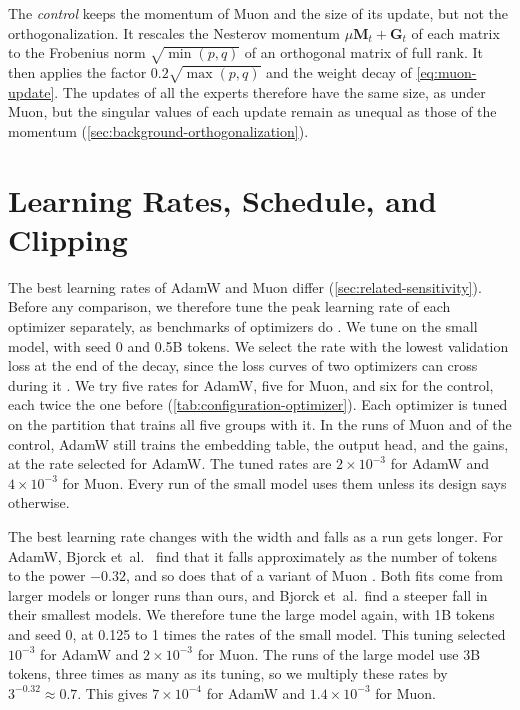 The \emph{control} keeps the momentum of Muon and the size of its update, but not the orthogonalization. It rescales the Nesterov momentum $\mu \mathbf{M}_t + \mathbf{G}_t$ of each matrix to the Frobenius norm $\sqrt{\min(p, q)}$ of an orthogonal matrix of full rank. It then applies the factor $0.2 \sqrt{\max(p, q)}$ and the weight decay of \cref{eq:muon-update}. The updates of all the experts therefore have the same size, as under Muon, but the singular values of each update remain as unequal as those of the momentum (\cref{sec:background-orthogonalization}).

\section{Learning Rates, Schedule, and Clipping}
\label{sec:method-tuning}
The best learning rates of AdamW and Muon differ (\cref{sec:related-sensitivity}). Before any comparison, we therefore tune the peak learning rate of each optimizer separately, as benchmarks of optimizers do \cite{wen2025fantastic, semenov2025benchmarking}. We tune on the small model, with seed 0 and 0.5B tokens. We select the rate with the lowest validation loss at the end of the decay, since the loss curves of two optimizers can cross during it \cite{wen2025fantastic}. We try five rates for AdamW, five for Muon, and six for the control, each twice the one before (\cref{tab:configuration-optimizer}). Each optimizer is tuned on the partition that trains all five groups with it. In the runs of Muon and of the control, AdamW still trains the embedding table, the output head, and the gains, at the rate selected for AdamW\@. The tuned rates are $2 \times 10^{-3}$ for AdamW and $4 \times 10^{-3}$ for Muon. Every run of the small model uses them unless its design says otherwise.

The best learning rate changes with the width and falls as a run gets longer. For AdamW, Bjorck et~al.~\cite{bjorck2025horizons} find that it falls approximately as the number of tokens to the power $-0.32$, and so does that of a variant of Muon \cite{ren2026hypersphere}. Both fits come from larger models or longer runs than ours, and Bjorck et~al.\ find a steeper fall in their smallest models. We therefore tune the large model again, with 1B tokens and seed 0, at 0.125 to 1 times the rates of the small model. This tuning selected $10^{-3}$ for AdamW and $2 \times 10^{-3}$ for Muon. The runs of the large model use 3B tokens, three times as many as its tuning, so we multiply these rates by $3^{-0.32} \approx 0.7$. This gives $7 \times 10^{-4}$ for AdamW and $1.4 \times 10^{-3}$ for Muon.


